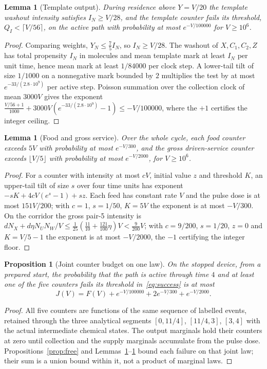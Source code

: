 \documentclass[11pt,a4paper]{article}
\theoremstyle{plain}
\newtheorem{proposition}[theorem]{Proposition}
\newtheorem{lemma}[theorem]{Lemma}
\theoremstyle{definition}
\theoremstyle{remark}
\newcommand{\Iv}{I}
\begin{document}
\begin{lemma}[Template output]\label{lem:template}
During residence above $Y=V/20$ the template washout intensity satisfies $\Iv_N\ge V/28$, and the template counter fails its threshold, $Q_I<\lceil V/56\rceil$, on the active path with probability at most $e^{-V/100000}$ for $V\ge10^6$.
\end{lemma}
\begin{proof}
Comparing weights, $Y_N\le\tfrac75\Iv_N$, so $\Iv_N\ge V/28$. The washout of $X,C_1,C_2,Z$ has total propensity $\Iv_N$ in molecules and mean template mark at least $\Iv_N$ per unit time, hence mean mark at least $1/84000$ per clock step. A lower-tail tilt of size $1/1000$ on a nonnegative mark bounded by $2$ multiplies the test by at most $e^{-33/(2.8\cdot10^{9})}$ per active step. Poisson summation over the collection clock of mean $3000V$ gives the exponent $\tfrac{V/56+1}{1000}+3000V(e^{-33/(2.8\cdot10^9)}-1)\le-V/100000$, where the $+1$ certifies the integer ceiling.
\end{proof}

\begin{lemma}[Food and gross service]\label{lem:supply}
Over the whole cycle, each food counter exceeds $5V$ with probability at most $e^{-V/300}$, and the gross driven-service counter exceeds $\lfloor V/5\rfloor$ with probability at most $e^{-V/2000}$, for $V\ge10^6$.
\end{lemma}
\begin{proof}
For a counter with intensity at most $cV$, initial value $z$ and threshold $K$, an upper-tail tilt of size $s$ over four time units has exponent $-sK+4cV(e^s-1)+sz$. Each feed has constant rate $V$ and the pulse dose is at most $151V/200$; with $c=1$, $s=1/50$, $K=5V$ the exponent is at most $-V/300$. On the corridor the gross pair-5 intensity is $dN_X+d\eta N_UN_W/V\le\tfrac1{25}(\tfrac{11}{10}+\tfrac{121}{100}\eta)V<\tfrac9{200}V$; with $c=9/200$, $s=1/20$, $z=0$ and $K=V/5-1$ the exponent is at most $-V/2000$, the $-1$ certifying the integer floor.
\end{proof}

\begin{proposition}[Joint counter budget on one law]\label{prop:counters}
On the stopped device, from a prepared start, the probability that the path is active through time $4$ and at least one of the five counters fails its threshold in~\eqref{eq:success} is at most
\begin{equation}\label{eq:J}
J(V)=F(V)+e^{-V/100000}+2e^{-V/300}+e^{-V/2000}.
\end{equation}
\end{proposition}
\begin{proof}
All five counters are functions of the same sequence of labelled events, retained through the three analytical segments $[0,11/4]$, $[11/4,3]$, $[3,4]$ with the actual intermediate chemical states. The output marginals hold their counters at zero until collection and the supply marginals accumulate from the pulse dose. Propositions~\ref{prop:free} and Lemmas~\ref{lem:template}--\ref{lem:supply} bound each failure on that joint law; their sum is a union bound within it, not a product of marginal laws.
\end{proof}
\end{document}
